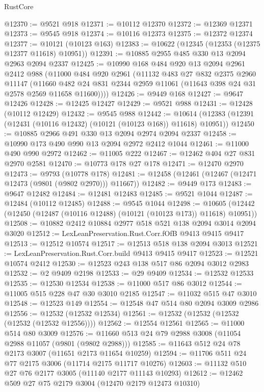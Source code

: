 \begin{lexlean}{RustCore}
\begin{coremodule}
@12370 := @9521 @918
@12371 := @10112 @12370
@12372 := @12369 @12371
@12373 := @9545 @918
@12374 := @10116 @12373
@12375 := @12372 @12374
@12377 := @10121 (@10123 @163)
@12383 := @10622 (@12345 (@12353 (@12375 @12377 @11618) @10951))
@12391 := @10885 @2955 @485 @330 @13 @2094 @2963 @2094 @2337
@12425 := @10990
    @168
    @484
    @920
    @13
    @2094
    @2961
    @2412
    @988
    (@11000
      @484
      @920
      @2961
      (@11132
        @483
        @27
        @832
        @2375
        @2960
        @11147
        (@11660 @482 @24 @831 @2344 @2959 @11061 (@11643 @398 @24 @31 @2578 @2569 @11658 @11600))))
@12426 := @9449 @168
@12427 := @9647 @12426
@12428 := @12425 @12427
@12429 := @9521 @988
@12431 := @12428 (@10112 @12429)
@12432 := @9545 @988
@12442 := @10614 (@12383 (@12391 (@12431 (@10116 @12432) (@10121 (@10123 @168)) @11618) @10951))
@12450 := @10885 @2966 @491 @330 @13 @2094 @2974 @2094 @2337
@12458 := @10990 @173 @490 @990 @13 @2094 @2972 @2412 @1044
@12461 := @11000 @490 @990 @2972
@12462 := @11005 @222
@12467 := @12462 @404 @27 @831 @2970 @2581
@12470 := @10773 @178 @27 @178
@12471 := @12470 @2970
@12473 := @9793 (@10778 @178)
@12481 := @12458 (@12461 (@12467 (@12471 @12473 (@9801 (@9802 @2970))) @11667))
@12482 := @9449 @173
@12483 := @9647 @12482
@12484 := @12481 @12483
@12485 := @9521 @1044
@12487 := @12484 (@10112 @12485)
@12488 := @9545 @1044
@12498 := @10605 (@12442 (@12450 (@12487 (@10116 @12488) (@10121 (@10123 @173)) @11618) @10951))
@12508 := @10882 @2412 @10884 @2977 @518 @521 @138 @2094 @3014 @2094 @3020
@12512 := LexLeanPreservation.Rust.Corr.fOfB @9413 @9415 @9417
@12513 := @12512 @10574
@12517 := @12513 @518 @138 @2094 @3013
@12521 := LexLeanPreservation.Rust.Corr.build @9413 @9415 @9417
@12523 := @12521 @10574 @2412
@12530 := @12523 @243 @138 @517 @86 @2094 @3012 @2983
@12532 := @2 @9409 @2198
@12533 := @29 @9409
@12534 := @12532 @12533
@12535 := @12530 @12534
@12538 := @11000 @517 @86 @3012
@12544 := @11005 @515 @228 @47 @30 @3010 @2185
@12547 := @11032 @515 @47 @3010
@12548 := @12523 @149
@12554 := @12548 @47 @514 @80 @2094 @3009 @2986
@12556 := @12532 (@12532 @12534)
@12561 := @12532 (@12532 (@12532 (@12532 (@12532 @12556))))
@12562 := @12554 @12561
@12565 := @11000 @514 @80 @3009
@12576 := @11660 @513 @24 @79 @2988 @3008 (@11054 @2988 @11057 (@9801 (@9802 @2988)))
@12585 := @11643 @512 @24 @78 @2173 @3007 (@11651 @2173 @11654 @10259)
@12594 := @11706 @511 @24 @77 @2175 @3006 (@11714 @2175 @11717 @10276)
@12603 := @11132 @510 @27 @76 @2177 @3005 (@11140 @2177 @11143 @10293)
@12612 := @12462 @509 @27 @75 @2179 @3004 (@12470 @2179 @12473 @10310)

\end{coremodule}
\end{lexlean}
